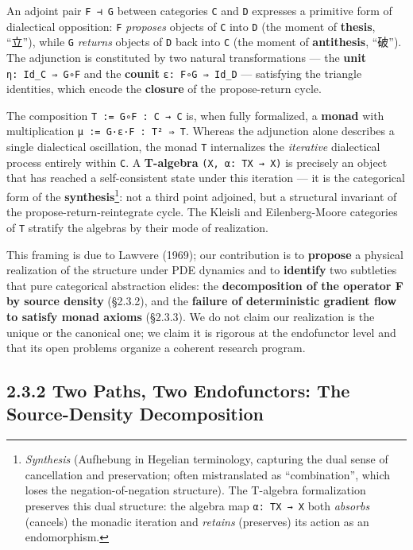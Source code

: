 \documentclass[
]{article}
\begin{document}
An adjoint pair \texttt{F\ ⊣\ G} between categories \texttt{C} and
\texttt{D} expresses a primitive form of dialectical opposition:
\texttt{F} \emph{proposes} objects of \texttt{C} into \texttt{D} (the
moment of \textbf{thesis}, ``立''), while \texttt{G} \emph{returns}
objects of \texttt{D} back into \texttt{C} (the moment of
\textbf{antithesis}, ``破''). The adjunction is constituted by two
natural transformations --- the \textbf{unit} \texttt{η:\ Id\_C\ ⇒\ G∘F}
and the \textbf{counit} \texttt{ε:\ F∘G\ ⇒\ Id\_D} --- satisfying the
triangle identities, which encode the \textbf{closure} of the
propose-return cycle.

The composition \texttt{T\ :=\ G∘F\ :\ C\ →\ C} is, when fully
formalized, a \textbf{monad} with multiplication
\texttt{μ\ :=\ G·ε·F\ :\ T²\ ⇒\ T}. Whereas the adjunction alone
describes a single dialectical oscillation, the monad \texttt{T}
internalizes the \emph{iterative} dialectical process entirely within
\texttt{C}. A \textbf{T-algebra} \texttt{(X,\ α:\ TX\ →\ X)} is
precisely an object that has reached a self-consistent state under this
iteration --- it is the categorical form of the
\textbf{synthesis}\footnote{\emph{Synthesis} (Aufhebung in Hegelian
  terminology, capturing the dual sense of cancellation and
  preservation; often mistranslated as ``combination'', which loses the
  negation-of-negation structure). The T-algebra formalization preserves
  this dual structure: the algebra map \texttt{α:\ TX\ →\ X} both
  \emph{absorbs} (cancels) the monadic iteration and \emph{retains}
  (preserves) its action as an endomorphism.}: not a third point
adjoined, but a structural invariant of the propose-return-reintegrate
cycle. The Kleisli and Eilenberg-Moore categories of \texttt{T} stratify
the algebras by their mode of realization.

This framing is due to Lawvere (1969); our contribution is to
\textbf{propose} a physical realization of the structure under PDE
dynamics and to \textbf{identify} two subtleties that pure categorical
abstraction elides: the \textbf{decomposition of the operator F by
source density} (§2.3.2), and the \textbf{failure of deterministic
gradient flow to satisfy monad axioms} (§2.3.3). We do not claim our
realization is the unique or the canonical one; we claim it is rigorous
at the endofunctor level and that its open problems organize a coherent
research program.

\hypertarget{two-paths-two-endofunctors-the-source-density-decomposition}{%
\subsection{2.3.2 Two Paths, Two Endofunctors: The Source-Density
Decomposition}\label{two-paths-two-endofunctors-the-source-density-decomposition}}
\end{document}
